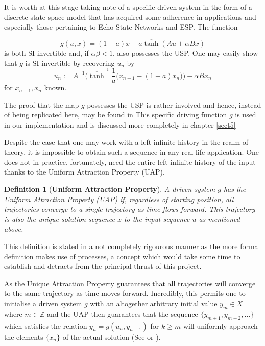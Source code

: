 \documentclass[a4paper,12pt,twoside]{report}
\newtheorem{Definition}{Definition}[]
\begin{document}
It is worth at this stage taking note of a specific driven system in the form of a discrete state-space model that has acquired some adherence in applications \cite{Manju_IEEE} and especially those pertaining to Echo State Networks and ESP. The function 

\begin{equation}  \label{eqn_driving}
  g(u,x) = (1-a)x + a\overline{\tanh}(Au + \alpha Bx)
\end{equation} 
is both SI-invertible and, if $\alpha\beta<1$, also possesses the USP. 
One may easily show that $g$ is SI-invertible by recovering $u_n$ by 
\begin{equation} \label{eqn_SI_RNN}
  u_n := A^{-1}\bigg(\overline{\tanh}^{^{-1}}\frac{1}{a}\Big(x_{n+1}-(1-a)x_n\Big) \bigg) - \alpha B x_n
  \end{equation}
  for $x_{n-1}, x_n$ known.

The proof that the map $g$ possesses the USP is rather involved and hence, instead of being replicated here, may be found in \cite[Th.2]{manjunath2013echo }
This specific driving function $g$ is used in our implementation and is discussed more completely in chapter \ref{sect5}

Despite the ease that one may work with a left-infinite history in the realm of theory, it is impossible to obtain such a sequence in any real-life application.  
One does not in practice, fortunately, need the entire left-infinite history of the input thanks to the Uniform Attraction Property (UAP).

\begin{Definition}
  [\bf Uniform Attraction Property]\label{Dfn_UAP}\rm
  A driven system $g$ has the Uniform Attraction Property (UAP) if, regardless of starting position, all trajectories converge to a single trajectory as time flows forward. 
  This trajectory is also the unique solution sequence $x$ to the input sequence $u$ as mentioned above.
\end{Definition}

This definition is stated in a not completely rigourous manner as the more formal definition makes use of processes, a concept which would take some time to establish and detracts from the principal thrust of this project. 

As the Unique Attraction Property guarantees that all trajectories will converge to the same trajectory as time moves forward. 
Incredibly, this permits one to initialise a driven system $g$ with an altogether arbitrary initial value $y_m\in{X}$ where $m\in\mathbb{Z}$ and the UAP then guarantees that the sequence $\{y_{m+1}, y_{m+2},\ldots\}$ which satisfies the relation $y_n=g(u_n, y_{n-1})$  for  $k\geq{m}$  will uniformly approach the elements $\{x_n\}$ of the actual solution (See \cite[Th.11,]{Manju_Nonlinearity} or \cite[Eqn.18]{Supp}).
 
\end{document}
